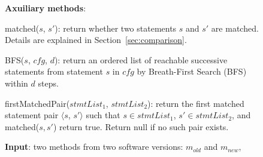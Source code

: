 \begin{figure}[t]
\textbf{Axuiliary methods}:

matched($\mathit{s}$, $\mathit{s'}$): return whether two statements
$\mathit{s}$ and $\mathit{s'}$ are matched. Details are explained
in Section~\ref{sec:comparison}.

BFS($\mathit{s}$, $\mathit{cfg}$, $\mathit{d}$): return an ordered list of reachable successive statements from statement $\mathit{s}$ in $\mathit{cfg}$ by Breath-First Search (BFS) within $\mathit{d}$ steps.

firstMatchedPair($\mathit{stmtList_1}$, $\mathit{stmtList_2}$): return the first matched statement pair $\langle$$\mathit{s}$, $\mathit{s'}$$\rangle$ such that $\mathit{s} \in \mathit{stmtList_1}$, $\mathit{s'} \in \mathit{stmtList_2}$, and matched($\mathit{s}, \mathit{s'}$) return true. Return null if no such pair exists.




\textbf{Input}: two methods from two software versions: $\mathit{m_{old}}$ and $m_{new}$,


\end{figure}
